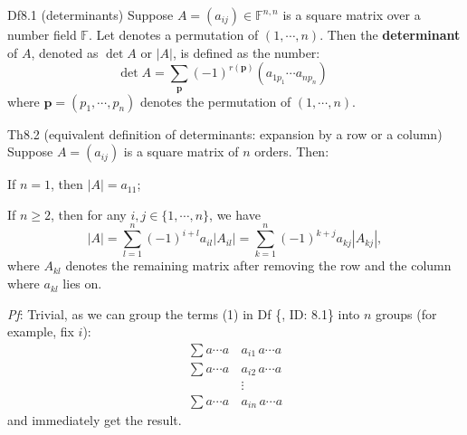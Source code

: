 \documentclass{article}
\begin{document}
\begin{Df}{Df8.1 (determinants)}
    Suppose $A = (a_{ij})\in \mathbb{F}^{n,n}$ is a square matrix over a number field $\mathbb{F}$. Let denotes a permutation of $(1,\cdots,n)$. Then the \textbf{determinant} of $A$, denoted as $\det A$ or $|A|$, is defined as the number:
    \begin{equation}
        \det A = \sum_{\pmb{p}} (-1)^{r(\pmb{p})} (a_{1p_1}\cdots a_{np_n})\qquad \tag{1}
    \end{equation}
    where $\pmb{p} = (p_1, \cdots, p_n)$ denotes the permutation of $(1,\cdots,n)$.
\end{Df}

\begin{Th}{Th8.2 (equivalent definition of determinants: expansion by a row or a column)}
    Suppose $A = (a_{ij})$ is a square matrix of $n$ orders. Then:
    \begin{compactenum}
        \item If $n=1$, then $|A| = a_{11}$;
        \item If $n\geq 2$, then for any $i,j\in \{1,\cdots,n\}$, we have
        $$ |A| = \sum_{l=1}^{n} (-1)^{i+l} a_{il}|A_{il}| = \sum_{k=1}^{n} (-1)^{k+j} a_{kj}|A_{kj}|, $$
        where $A_{kl}$ denotes the remaining matrix after removing the row and the column where $a_{kl}$ lies on.
    \end{compactenum}
    \tcblower
    \textit{Pf}: Trivial, as we can group the terms (1) in Df \{, ID: 8.1\} into $n$ groups (for example, fix $i$):
    $$
    \begin{aligned}
        \sum a\cdots a\, & a_{i1}\, a\cdots a \\
        \sum a\cdots a\, & a_{i2}\, a\cdots a \\
        &\vdots \\
        \sum a\cdots a\, & a_{in}\, a\cdots a
    \end{aligned}
    $$
    and immediately get the result.
\end{Th}
\end{document}
